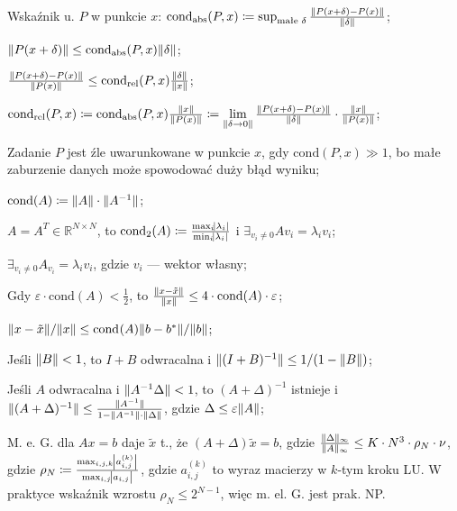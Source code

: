 
\entry
Wskaźnik u. $P$ w punkcie $x$:
$\mathrm{cond}_{\mathrm{abs}}(P,x) \coloneqq \sup_{\text{małe }\delta} \frac{\|P(x+\delta) - P(x)\|}{\|\delta\|}$;

\entry
$\|P(x+\delta)\| \leq \mathrm{cond}_{\mathrm{abs}}(P,x)\|\delta\|$;

\entry
$\frac{\|P(x+\delta) - P(x)\|}{\|P(x)\|} \leq \mathrm{cond}_{\mathrm{rel}}(P,x)\frac{\|\delta\|}{\|x\|}$;


\entry
$
\mathrm{cond}_{\mathrm{rel}}(P,x) \coloneqq
\mathrm{cond}_{\mathrm{abs}}(P,x) \frac{\|x\|}{\|P(x)\|}  \coloneqq
\lim\limits_{\|\delta \to 0\|} \frac{\|P(x+\delta) - P(x)\|}{\|\delta\|} \cdot \frac{\|x\|}{\|P(x)\|}
$;

\entry
Zadanie $P$ jest źle uwarunkowane w punkcie $x$,
gdy $\mathrm{cond}(P,x) \gg 1$,
bo małe zaburzenie danych może spowodować duży błąd wyniku;

\entry
$\mathrm{cond}(A) \coloneqq \norm{\vphantom{A^{-1}}A}\cdot\norm{A^{-1}}$;

\entry
$A=A^T\in\mathbb{R}^{N\times N}$,
to
$\mathrm{cond}_2(A)\coloneqq \frac{\max_i\abs{\lambda_i}}{\min_i\abs{\lambda_i}}$
i
$\exists_{v_i\neq 0} Av_i=\lambda_i v_i$;

\entry
$\exists_{v_i\neq 0} A_{v_i} = \lambda_i v_i$,
gdzie $v_i$ --- wektor własny;

\entry
Gdy
$\varepsilon\cdot\mathrm{cond}(A) < \frac{1}{2}$,
to $\frac{\|x - \tilde{x}\|}{\|x\|} \leq 4 \cdot \mathrm{cond}(A) \cdot \varepsilon$;

\entry
$\|x - \tilde{x}\| / \|x\| \leq \mathrm{cond}_{}(A) \|b - b^{*}\| / \|b\|$;

\entry
Jeśli $\|B\| < 1$,
to $I+B$ odwracalna i $\|(I+B)^{-1}\| \leq 1 / (1 - \|B\|)$;

\entry
Jeśli $A$ odwracalna i $\|A^{-1}\Delta\| < 1$,
to $(A+\Delta)^{-1}$ istnieje
i $\|(A+\Delta)^{-1}\| \leq \frac{\|A^{-1}\|}{1 - \|A^{-1}\| \cdot \|\vphantom{A^1}\Delta\|}$,
gdzie $\Delta \leq \varepsilon\|A\|$;

\entry
M. e. G. dla $Ax=b$ daje $\tilde{x}$ t., że
$(A+\Delta) \tilde{x} = b$,
gdzie $\frac{\|\Delta\|_\infty}{\|A\|_\infty} \leq K\cdot N^3 \cdot \rho_N \cdot \nu$,
gdzie $\rho_N \coloneqq \frac{\max_{i,j,k}\abs{a_{i,j}^{(k)}}}{\max_{i,j} \abs{a_{i,j}}}$,
gdzie $a^{(k)}_{i,j}$ to wyraz macierzy w $k$-tym kroku LU. W praktyce wskaźnik wzrostu $\rho_N\leq 2^{N-1}$, więc m. el. G. jest prak. NP.

